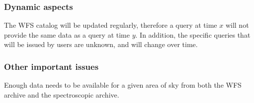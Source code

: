 
 \subsubsection*{Dynamic aspects}



The WFS catalog will be updated regularly, therefore a query at time $x$ will not provide the same data as a query at time $y$.  In addition, the specific queries that will be issued by users are unknown, and will change over time.

 \subsubsection*{Other important issues}



Enough data needs to be available for a given area of sky from both the WFS archive and the spectroscopic archive.

%
%
%
%
%
%
%
%
%
%
%
%
%
%
%
%
%
%
%


